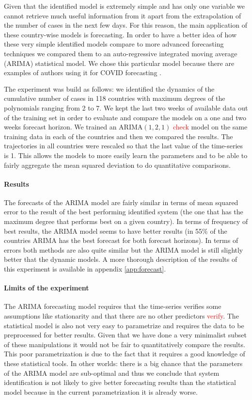\documentclass[12pt, letterpaper]{article}
\newcommand{\com}[1]{{\small {\fontfamily{ptm} \selectfont \textcolor{red}{#1}}}}
\begin{document}
Given that the identified model is extremely simple and has only one variable we cannot retrieve much useful information from it apart from the extrapolation of the number of cases in the next few days. 
For this reason, the main application of these country-wise models is forecasting. 
In order to have a better idea of how these very simple identified models compare to more advanced forecasting techniques we compared them to an auto-regressive integrated moving average (ARIMA) statistical model. We chose this particular model because there are examples of authors using it for COVID forecasting \cite{arima}.

The experiment was build as follows: we identified the dynamics of the cumulative number of cases in 118 countries with maximum degrees of the polynomials ranging from 2 to 7. 
We kept the last two weeks of available data out of the training set in order to evaluate and compare the models on a one and two weeks forecast horizon.
We trained an ARIMA$(1, 2, 1)$ \com{check} model on the same training data in each of the countries and then we compared the results. 
The trajectories in all countries were rescaled so that the last value of the time-series is 1. 
This allows the models to more easily learn the parameters and to be able to fairly aggregate the mean squared deviation to do quantitative comparisons.

\paragraph{Results} The forecasts of the ARIMA model are fairly similar in terms of mean squared error to the result of the best performing identified system (the one that has the maximum degree that performs best on a given country). 
In terms of frequency of best results, the ARIMA model seems to have better results (in 55\% of the countries ARIMA has the best forecast for both forecast horizons). 
In terms of errors both methods are also quite similar but the ARIMA model is still slightly better that the dynamic models. A more thorough description of the results of this experiment is available in appendix \ref{app:forecast}.

\paragraph{Limits of the experiment}

The ARIMA forecasting model requires that the time-series verifies some assumptions like stationarity and that there are no other predictors \com{verify}. 
The statistical model is also not very easy to parametrize and requires the data to be preprocessed for better results.
Given that we have done a very minimalist subset of these manipulations it would not be fair to quantitatively compare the results.
This poor parametrization is due to the fact that it requires a good knowledge of these statistical tools.
In other worlds: there is a big chance that the parameters of the ARIMA model are sub-optimal and thus we conclude that system identification is not likely to give better forecasting results than the statistical model because in the current parametrization it is already worse.
\end{document}
